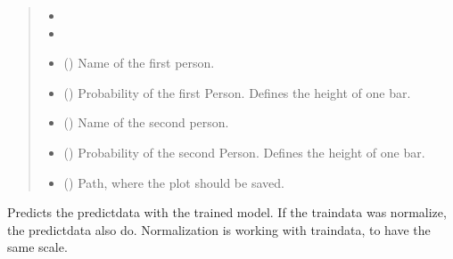 \documentclass[letterpaper,10pt,english]{sphinxmanual}
\begin{document}
\begin{fulllineitems}
\begin{fulllineitems}
\begin{quote}
\begin{description}
\begin{itemize}
\item {} 
\sphinxAtStartPar
{} \textendash{} 

\item {} 
\sphinxAtStartPar
{} \textendash{} 

\item {} 
\sphinxAtStartPar
{} () \textendash{} Name of the first person.

\item {} 
\sphinxAtStartPar
{} () \textendash{} Probability of the first Person. Defines the height of one bar.

\item {} 
\sphinxAtStartPar
{} () \textendash{} Name of the second person.

\item {} 
\sphinxAtStartPar
{} () \textendash{} Probability of the second Person. Defines the height of one bar.

\item {} 
\sphinxAtStartPar
{} () \textendash{} Path, where the plot should be saved.

\end{itemize}

\end{description}\end{quote}

\end{fulllineitems}


\begin{fulllineitems}
\label{\detokenize{anoog.automation:anoog.automation.ai_model.AI_Model.predict}}
\sphinxAtStartPar
Predicts the predict\sphinxhyphen{}data with the trained model.
If the train\sphinxhyphen{}data was normalize, the predict\sphinxhyphen{}data also do. Normalization is working with train\sphinxhyphen{}data,
to have the same scale.


\end{fulllineitems}
\end{fulllineitems}
\end{document}

